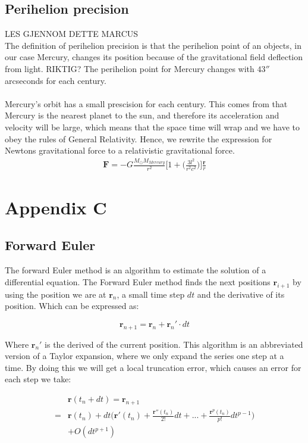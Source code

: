 \documentclass{article}
\begin{document}
\subsection{Perihelion precision}
LES GJENNOM DETTE MARCUS\\
The definition of perihelion precision is that the perihelion point of an objects, in our case Mercury, changes its position because of 
the gravitational field deflection from light. RIKTIG? The perihelion point for Mercury changes with $43''$ arcseconds for each century. \\
\\
Mercury's orbit has a small prescision for each century. This comes from that Mercury is the nearest planet to the sun, and therefore its acceleration and velocity will be large, which means that the space time will wrap    and we have to obey the rules of General Relativity. Hence, we rewrite the expression for Newtons gravitational force to a relativistic gravitational force.
\begin{align}
    \mathbf{F}=-G\frac{M_{\odot}M_{Mercury}}{r^2}\Bigg[1+\Bigg(\frac{3l^2}{r^2c^2}\bigg)\bigg]\frac{\mathbf{r}}{r}
\end{align}

\section*{Appendix C} %
\subsection{Forward Euler}
The forward Euler method is an algorithm to estimate the solution of a differential equation. The Forward Euler method  finds the next positions $\mathbf{r}_{i+1}$ by using the position we are at $\mathbf{r}_{n}$, a small time step $dt$ and the derivative of its position. Which can be expressed as:

\begin{equation}
\mathbf{r}_{n+1}=\mathbf{r}_n + \mathbf{r}_n'\cdot dt
\label{eq:yn1}
\end{equation}

Where $\mathbf{r}_n'$ is the derived of the current position. This algorithm is an abbreviated version of a Taylor expansion, where we only expand the series one step at a time. By doing this we will get a local truncation error, which causes an error for each step we take:

\begin{equation}
\begin{split}
&\mathbf{r}(t_n+dt)=\mathbf{r}_{n+1}\\
=&\mathbf{r}(t_n)+dt\bigg(\mathbf{r}'(t_n) + \frac{\mathbf{r}''(t_n)}{2!}dt + ... + \frac{\mathbf{r}^p(t_n)}{p!}dt^{p-1}\bigg) \\
&+ O(dt^{p+1})
\end{split}
\label{eq:ytndt}
\end{equation} 
\end{document}
